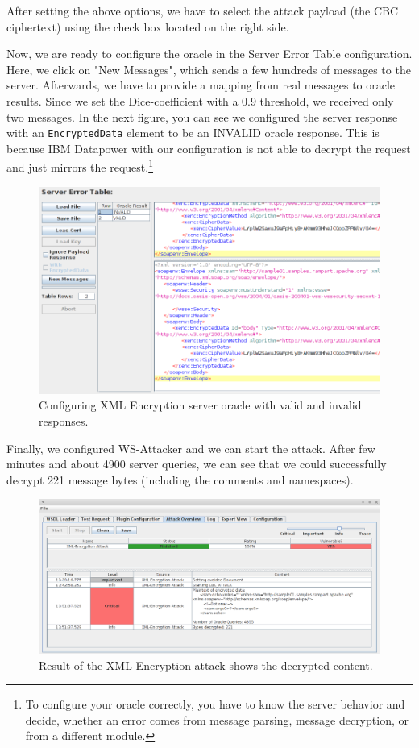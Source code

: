 After setting the above options, we have to select the attack payload (the CBC ciphertext) using the check box located on the right side. 

Now, we are ready to configure the oracle in the Server Error Table configuration. Here, we click on "New Messages", which sends a few hundreds of messages to the server. Afterwards, we have to provide a mapping from real messages to oracle results. Since we set the Dice-coefficient with a 0.9 threshold, we received only two messages. In the next figure, you can see we configured the server response with an \texttt{EncryptedData} element to be an INVALID oracle response. This is because IBM Datapower with our configuration is not able to decrypt the request and just mirrors the request.\footnote{To configure your oracle correctly, you have to know the server behavior and decide, whether an error comes from message parsing, message decryption, or from a different module.}

\begin{figure}[!ht]
    \centering
    \includegraphics[width=0.95\linewidth]{img/xenc-config2}
    \caption{Configuring XML Encryption server oracle with valid and invalid responses.}
    \label{fig:xenc-config2}
\end{figure}

Finally, we configured WS-Attacker and we can start the attack. After few minutes and about 4900 server queries, we can see that we could successfully decrypt 221 message bytes (including the comments and namespaces).

\begin{figure}[!ht]
    \centering
    \includegraphics[width=\linewidth]{img/xenc-result}
    \caption{Result of the XML Encryption attack shows the decrypted content.}
    \label{fig:xenc-result}
\end{figure}
